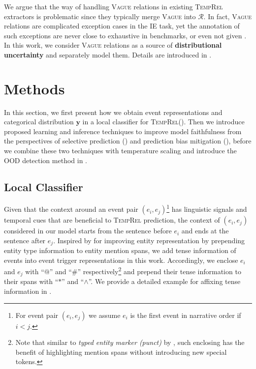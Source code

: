 \documentclass[11pt]{article}
\newcommand{\temprel}{\textsc{TempRel}\xspace}
\newcommand{\yb}{\mathbf{y}}
\begin{document}
We argue that the way of handling \textsc{Vague} relations in existing \temprel extractors is problematic since they typically merge \textsc{Vague} into $\mathcal{R}$.
In fact, \textsc{Vague} relations are complicated exception cases in the IE task, yet the annotation of such exceptions are never close to exhaustive in benchmarks, or even not given \cite{naik-etal-2019-tddiscourse}.
In this work, we consider \textsc{Vague} relations as a source of \textbf{distributional uncertainty} and separately model them.
Details are introduced in .

\section{Methods}
In this section, we first present how we obtain event representations and categorical distribution $\yb$ in a local classifier for \temprel (). Then we introduce proposed learning and inference techniques to improve model faithfulness from the perspectives of selective prediction () and prediction bias mitigation  (), before we combine these two techniques with temperature scaling and introduce the OOD detection method in .


\subsection{Local Classifier}
\label{sec:event_rep}
Given that the context around an event pair $(e_i, e_j)$\footnote{For event pair $(e_i, e_j)$ we assume $e_i$ is the first event in narrative order if $i < j$.} has linguistic signals and temporal cues that are beneficial to \temprel prediction, the context of $(e_i, e_j)$ considered in our model starts from the sentence before $e_i$ and ends at the sentence after $e_j$.
Inspired by \citet{ZC21} for improving entity representation by prepending entity type information to entity mention spans, we add tense information of events into event trigger representations in this work.
Accordingly, we enclose $e_i$ and $e_j$ with ``$@$'' and ``\#'' respectively\footnote{Note that similar to  \emph{typed entity marker (punct)} by \citet{ZC21}, such enclosing has the benefit of highlighting mention spans without introducing new special tokens.} and prepend their tense information to their spans with ``$*$'' and ``$\wedge$''.
We provide a detailed example for affixing tense information in . 
\end{document}
